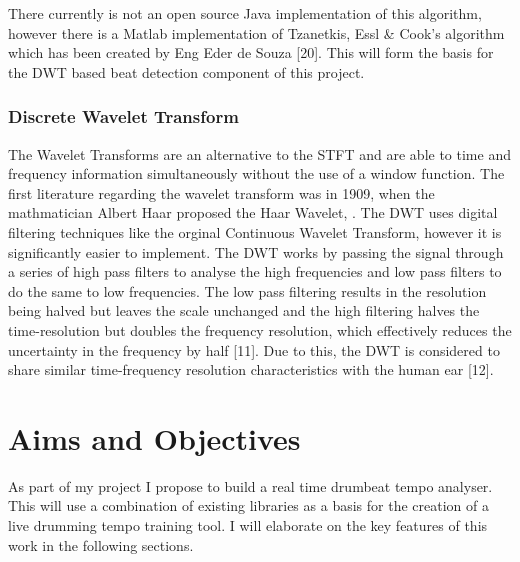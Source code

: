 \documentclass[a4paper, 11pt]{article}
\begin{document}
There currently is not an open source Java implementation of this algorithm, however there is a Matlab implementation of Tzanetkis, Essl \& Cook's algorithm which has been created by Eng Eder de Souza [20]. This will form the basis for the DWT based beat detection component of this project.


\subsubsection{Discrete Wavelet Transform}
The Wavelet Transforms are an alternative to the STFT and are able to time and frequency information simultaneously without the use of a window function. The first literature regarding the wavelet transform was in 1909, when the mathmatician Albert Haar proposed the Haar Wavelet,  . The DWT uses digital filtering techniques like the orginal Continuous Wavelet Transform, however it is significantly easier to implement. The DWT works by passing the signal through a series of high pass filters to analyse the high frequencies and low pass filters to do the same to low frequencies. The low pass filtering results in the resolution being halved but leaves the scale unchanged and the high filtering halves the time-resolution but doubles the frequency resolution, which effectively reduces the uncertainty in the frequency by half [11]. Due to this, the DWT is considered to share similar time-frequency resolution characteristics with the human ear [12].





\maketitle{}
\section{Aims and Objectives}

As part of my project I propose to build a real time drumbeat tempo analyser. This will use a combination of existing libraries as a basis for the creation of a live drumming tempo training tool. I will elaborate on the key features of this work in the following sections.
\end{document}
